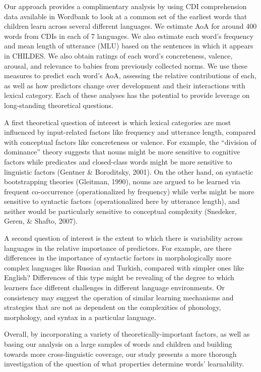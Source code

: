 \documentclass[10pt, letterpaper]{article}
\begin{document}
Our approach provides a complimentary analysis by using CDI
comprehension data available in Wordbank to look at a common set of the
earliest words that children learn across several different languages.
We estimate AoA for around 400 words from CDIs in each of 7 languages.
We also estimate each word's frequency and mean length of utterance
(MLU) based on the sentences in which it appears in CHILDES. We also
obtain ratings of each word's concreteness, valence, arousal, and
relevance to babies from previously collected norms. We use these
measures to predict each word's AoA, assessing the relative
contributions of each, as well as how predictors change over development
and their interactions with lexical category. Each of these analyses has
the potential to provide leverage on long-standing theoretical
questions.

A first theoretical question of interest is which lexical categories are
most influenced by input-related factors like frequency and utterance
length, compared with conceptual factors like concreteness or valence.
For example, the ``division of dominance'' theory suggests that nouns
might be more sensitive to cognitive factors while predicates and
closed-class words might be more sensitive to linguistic factors
(Gentner \& Boroditsky, 2001). On the other hand, on syntactic
bootstrapping theories (Gleitman, 1990), nouns are argued to be learned
via frequent co-occurrence (operationalized by frequency) while verbs
might be more sensitive to syntactic factors (operationalized here by
utterance length), and neither would be particularly sensitive to
conceptual complexity (Snedeker, Geren, \& Shafto, 2007).

A second question of interest is the extent to which there is
variability across languages in the relative importance of predictors.
For example, are there differences in the importance of syntactic
factors in morphologically more complex languages like Russian and
Turkish, compared with simpler ones like English? Differences of this
type might be revealing of the degree to which learners face different
challenges in different language environments. Or consistency may
suggest the operation of similar learning mechanisms and strategies that
are not as dependent on the complexities of phonology, morphology, and
syntax in a particular language.

Overall, by incorporating a variety of theoretically-important factors,
as well as basing our analysis on a large samples of words and children
and building towards more cross-linguistic coverage, our study presents
a more thorough investigation of the question of what properties
determine words' learnability.
\end{document}
